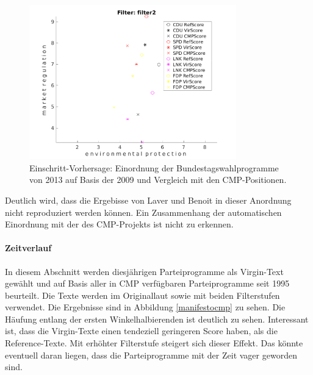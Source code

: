     \begin{figure}
    
        \includegraphics[width = 0.8\textwidth]{images/one_environmental_protection_market_regulation_filter2.png}
        \caption{Einschritt-Vorhersage: Einordnung der Bundestagswahlprogramme von 2013 auf Basis der 2009 und Vergleich mit den CMP-Positionen. 
                 \label{fig:one20092013}}
    \end{figure}
    
Deutlich wird, dass die Ergebisse von Laver und Benoit in dieser Anordnung nicht reproduziert werden können. Ein Zusammenhang der automatischen Einordnung mit der des CMP-Projekts ist nicht zu erkennen.      
    
    \paragraph{Zeitverlauf}
     In diesem Abschnitt werden diesjährigen Parteiprogramme als Virgin-Text gewählt und auf Basis aller in CMP verfügbaren Parteiprogramme seit 1995 beurteilt. Die Texte werden im Originallaut sowie mit beiden Filterstufen verwendet. 
     Die Ergebnisse sind in Abbildung \ref{manifestocmp} zu sehen. Die Häufung entlang der ersten Winkelhalbierenden ist deutlich zu sehen. Interessant ist, dass die Virgin-Texte einen tendeziell geringeren Score haben, als die Reference-Texte. Mit erhöhter Filterstufe steigert sich dieser Effekt. Das könnte eventuell daran liegen, dass die Parteiprogramme mit der Zeit vager geworden sind.
     
